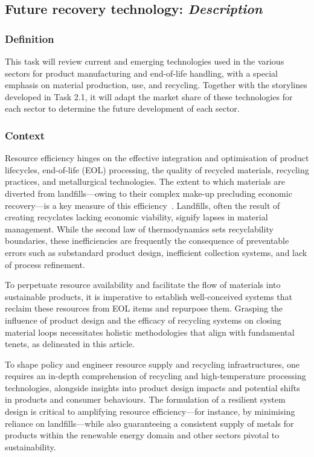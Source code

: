 \subsection{Future recovery technology: \textit{Description}}

\subsubsection{Definition}
This task will review current and emerging technologies used in the various sectors for product manufacturing and
end-of-life handling, with a special emphasis on material production, use, and recycling. Together with the storylines
developed in Task 2.1, it will adapt the market share of these technologies for each sector to determine the future
development of each sector.


\subsubsection{Context}

Resource efficiency hinges on the effective integration and optimisation of product lifecycles, end-of-life (EOL) processing, the quality of recycled materials, recycling practices, and metallurgical technologies. The extent to which materials are diverted from landfills---owing to their complex make-up precluding economic recovery---is a key measure of this efficiency~\cite{reuter2012recyclinglimits}. Landfills, often the result of creating recyclates lacking economic viability, signify lapses in material management. While the second law of thermodynamics sets recyclability boundaries, these inefficiencies are frequently the consequence of preventable errors such as substandard product design, inefficient collection systems, and lack of process refinement.

To perpetuate resource availability and facilitate the flow of materials into sustainable products, it is imperative to establish well-conceived systems that reclaim these resources from EOL items and repurpose them. Grasping the influence of product design and the efficacy of recycling systems on closing material loops necessitates holistic methodologies that align with fundamental tenets, as delineated in this article.

To shape policy and engineer resource supply and recycling infrastructures, one requires an in-depth comprehension of recycling and high-temperature processing technologies, alongside insights into product design impacts and potential shifts in products and consumer behaviours. The formulation of a resilient system design is critical to amplifying resource efficiency---for instance, by minimising reliance on landfills---while also guaranteeing a consistent supply of metals for products within the renewable energy domain and other sectors pivotal to sustainability.

